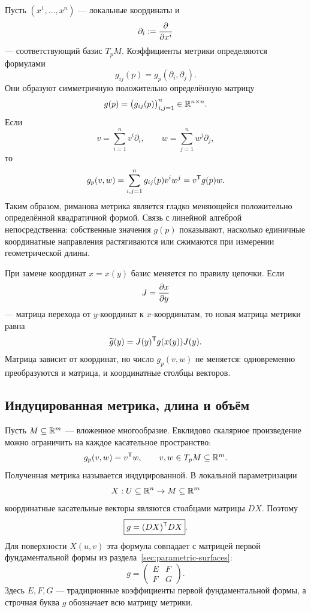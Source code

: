 Пусть $(x^1,\ldots,x^n)$ --- локальные координаты и
\[
\partial_i:=\frac{\partial }{\partial x^i}
\]
--- соответствующий базис $T_pM$. Коэффициенты метрики определяются формулами
\begin{equation}
\label{eq:metric-coefficients}
g_{ij}(p)=g_p(\partial_i,\partial_j).
\end{equation}
Они образуют симметричную положительно определённую матрицу
\[
g(p)=\bigl(g_{ij}(p)\bigr)_{i,j=1}^n\in\mathbb{R}^{n\times n}.
\]
Если
\[
v=\sum_{i=1}^n v^i\partial_i,
\qquad
w=\sum_{j=1}^n w^j\partial_j,
\]
то
\begin{equation}
\label{eq:metric-coordinate-quadratic-form}
g_p(v,w)
=
\sum_{i,j=1}^n g_{ij}(p)v^iw^j
=
v^{\mathsf{T}}g(p)w.
\end{equation}
Таким образом, риманова метрика является гладко меняющейся положительно определённой квадратичной формой. Связь с линейной алгеброй непосредственна: собственные значения $g(p)$ показывают, насколько единичные координатные направления растягиваются или сжимаются при измерении геометрической длины.

При замене координат $x=x(y)$ базис меняется по правилу цепочки. Если
\[
J=\frac{\partial x}{\partial y}
\]
--- матрица перехода от $y$-координат к $x$-координатам, то новая матрица метрики равна
\begin{equation}
\label{eq:riemannian-metric-coordinate-change}
\widetilde g(y)=J(y)^{\mathsf{T}}g(x(y))J(y).
\end{equation}
Матрица зависит от координат, но число $g_p(v,w)$ не меняется: одновременно преобразуются и матрица, и координатные столбцы векторов.

\subsection{Индуцированная метрика, длина и объём}

Пусть $M\subseteq\mathbb{R}^m$ --- вложенное многообразие. Евклидово скалярное произведение можно ограничить на каждое касательное пространство:
\begin{equation}
\label{eq:induced-metric-submanifold}
g_p(v,w)=v^{\mathsf{T}}w,
\qquad
v,w\in T_pM\subseteq\mathbb{R}^m.
\end{equation}
Полученная метрика называется индуцированной. В локальной параметризации
\[
X:U\subseteq\mathbb{R}^n\to M\subseteq\mathbb{R}^m
\]
координатные касательные векторы являются столбцами матрицы $DX$. Поэтому
\begin{equation}
\label{eq:induced-metric-jacobian-v06}
\boxed{g=(DX)^{\mathsf{T}}DX}.
\end{equation}
Для поверхности $X(u,v)$ эта формула совпадает с матрицей первой фундаментальной формы из раздела~\ref{sec:parametric-surfaces}:
\[
g=
\begin{pmatrix}
E&F\\
F&G
\end{pmatrix}.
\]
Здесь $E,F,G$ --- традиционные коэффициенты первой фундаментальной формы, а строчная буква $g$ обозначает всю матрицу метрики.

